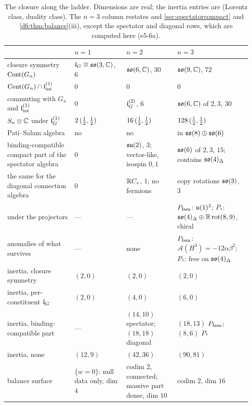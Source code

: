 \begin{table}[htbp]
\centering
\footnotesize
\begin{tabular}{@{}>{\raggedright\arraybackslash}p{3.4cm}>{\raggedright\arraybackslash}p{2.9cm}>{\raggedright\arraybackslash}p{4.3cm}>{\raggedright\arraybackslash}p{3.9cm}@{}}
\toprule
 & $n=1$ & $n=2$ & $n=3$\\
\midrule
closure symmetry $\operatorname{Cent}(G_n)$ & $\mathfrak l_G\cong\mathfrak{so}(3,\mathbb{C})$, $6$ & $\mathfrak{so}(6,\mathbb{C})$, $30$ & $\mathfrak{so}(9,\mathbb{C})$, $72$\\
$\operatorname{Cent}(G_n)\cap\mathfrak l_{\rm int}^{(1)}$ & $0$ & $0$ & $0$\\
commuting with $G_n$ and $\mathfrak l_{\rm int}^{(1)}$ & $0$ & $\mathfrak l_G^{(2)}$, $6$ & $\mathfrak{so}(6,\mathbb{C})$ of $2,3$, $30$\\
$S_n\otimes\mathbb{C}$ under $\mathfrak l_G^{(1)}$ & $2\,(\tfrac12,\tfrac12)$ & $16\,(\tfrac12,\tfrac12)$ & $128\,(\tfrac12,\tfrac12)$\\
Pati--Salam algebra & no & no & in $\mathfrak{so}(8)\oplus\mathfrak{so}(6)$\\
binding-compatible compact part of the spectator algebra & $0$ & $\mathfrak{su}(2)$, $3$; vector-like, isospin $0,1$ & $\mathfrak{so}(6)$ of $2,3$, $15$; contains $\mathfrak{so}(4)_\Delta$\\
the same for the diagonal connection algebra & $0$ & $\mathbb{R} C_v$, $1$; no fermions & copy rotations $\mathfrak{so}(3)$, $3$\\
under the projectors & --- & --- & $P_{\rm fam}$: $\mathfrak{u}(1)^2$; $P_*$: $\mathfrak{so}(4)_\Delta\oplus\mathbb{R}\,\mathrm{rot}(8,9)$, chiral\\
anomalies of what survives & --- & none & $P_{\rm fam}$: $\mathcal A(H^3)=-12\alpha\beta^2$; $P_*$: free on $\mathfrak{so}(4)_\Delta$\\
inertia, closure symmetry & $(2,0)$ & $(2,0)$ & $(2,0)$\\
inertia, per-constituent $\mathfrak l_G$ & $(2,0)$ & $(4,0)$ & $(6,0)$\\
inertia, binding-compatible part & --- & $(14,10)$ spectator; $(18,18)$ diagonal & $(18,13)$ $P_{\rm fam}$; $(8,6)$ $P_*$\\
inertia, none & $(12,9)$ & $(42,36)$ & $(90,81)$\\
balance surface & $\{w=0\}$: null data only, dim $4$ & codim $2$, connected; massive part dense, dim $10$ & codim $2$, dim $16$\\
\bottomrule
\end{tabular}
\caption{The closure along the ladder. Dimensions are real; the inertia entries are (Lorentz class, duality class). The $n=3$ column restates  and \cref{sec:spectatorcompact} and \cref{d6:thm:balance}(iii), except the spectator and diagonal rows, which
are computed here (e5-6a).}
\label{e5:tab:ladder}
\end{table}

